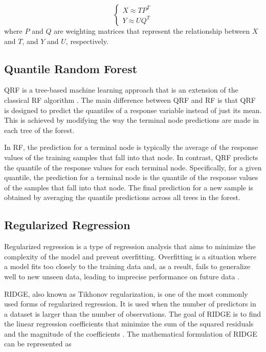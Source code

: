 \begin{equation}
    \begin{cases}
            X \approx TP^T \\
            Y \approx UQ^T
    \end{cases}
\end{equation}
where $P$ and $Q$ are weighting matrices that represent the relationship between $X$ and $T$, and $Y$ and $U$, respectively.

\subsection{Quantile Random Forest}
\ac{QRF} \cite{meinshausen2006Quantile} is a tree-based machine learning approach that is an extension of the classical \ac{RF} algorithm \cite{breiman2001Random}. The main difference between \ac{QRF} and \ac{RF} is that \ac{QRF} is designed to predict the quantiles of a response variable instead of just its mean. This is achieved by modifying the way the terminal node predictions are made in each tree of the forest.

In \ac{RF}, the prediction for a terminal node is typically the average of the response values of the training samples that fall into that node. In contrast, \ac{QRF} predicts the quantile of the response values for each terminal node. Specifically, for a given quantile, the prediction for a terminal node is the quantile of the response values of the samples that fall into that node. The final prediction for a new sample is obtained by averaging the quantile predictions across all trees in the forest. 

\subsection{Regularized Regression}
Regularized regression is a type of regression analysis that aims to minimize the complexity of the model and prevent overfitting. Overfitting is a situation where a model fits too closely to the training data and, as a result, fails to generalize well to new unseen data, leading to imprecise performance on future data \cite{hoerl1970Ridge}.

\ac{RIDGE}, also known as Tikhonov regularization, is one of the most commonly used forms of regularized regression. It is used when the number of predictors in a dataset is larger than the number of observations. The goal of \ac{RIDGE} is to find the linear regression coefficients that minimize the sum of the squared residuals and the magnitude of the coefficients \cite{hoerl1970Ridge}. The mathematical formulation of \ac{RIDGE} can be represented as

